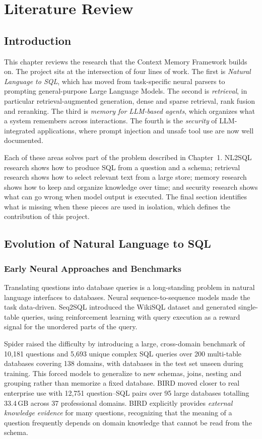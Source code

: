 \chapter{Literature Review}

\section{Introduction}
This chapter reviews the research that the Context Memory Framework builds on. The project
sits at the intersection of four lines of work. The first is \textit{Natural Language to
SQL}, which has moved from task-specific neural parsers to prompting general-purpose Large
Language Models. The second is \textit{retrieval}, in particular retrieval-augmented
generation, dense and sparse retrieval, rank fusion and reranking. The third is
\textit{memory for LLM-based agents}, which organizes what a system remembers across
interactions. The fourth is the \textit{security} of LLM-integrated applications, where
prompt injection and unsafe tool use are now well documented.

Each of these areas solves part of the problem described in Chapter~1. NL2SQL research
shows how to produce SQL from a question and a schema; retrieval research shows how to
select relevant text from a large store; memory research shows how to keep and organize
knowledge over time; and security research shows what can go wrong when model output is
executed. The final section identifies what is missing when these pieces are used in
isolation, which defines the contribution of this project.

\section{Evolution of Natural Language to SQL}

\subsection{Early Neural Approaches and Benchmarks}
Translating questions into database queries is a long-standing problem in natural
language interfaces to databases. Neural sequence-to-sequence models made the task
data-driven. Seq2SQL \cite{zhong2017seq2sql} introduced the WikiSQL dataset and generated
single-table queries, using reinforcement learning with query execution as a reward signal
for the unordered parts of the query.

Spider \cite{yu2018spider} raised the difficulty by introducing a large, cross-domain
benchmark of 10,181 questions and 5,693 unique complex SQL queries over 200 multi-table
databases covering 138 domains, with databases in the test set unseen during training. This
forced models to generalize to new schemas, joins, nesting and grouping rather than
memorize a fixed database. BIRD \cite{li2023bird} moved closer to real enterprise use with
12,751 question--SQL pairs over 95 large databases totalling 33.4\,GB across 37
professional domains. BIRD explicitly provides \textit{external knowledge evidence} for
many questions, recognizing that the meaning of a question frequently depends on domain
knowledge that cannot be read from the schema.

